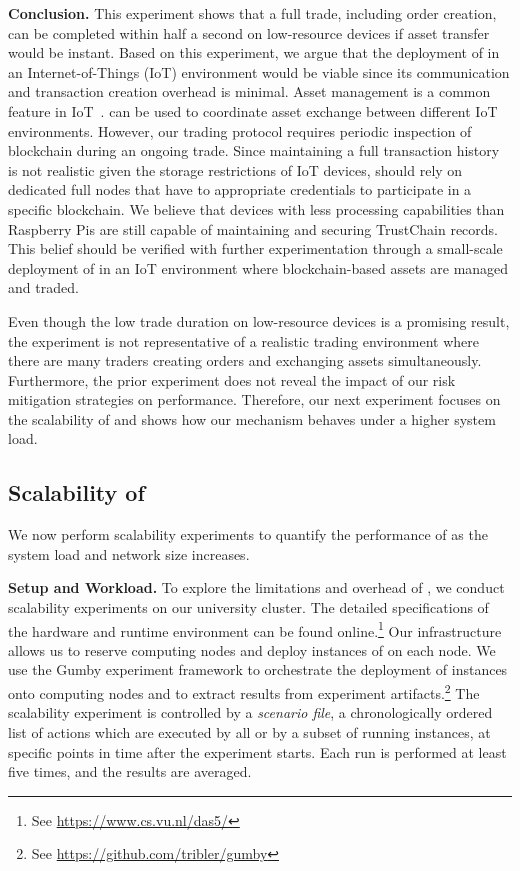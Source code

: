\textbf{Conclusion.}
This experiment shows that a full trade, including order creation, can be completed within half a second on low-resource devices if asset transfer would be instant.
Based on this experiment, we argue that the deployment of \ModelName{} in an Internet-of-Things (IoT) environment would be viable since its communication and transaction creation overhead is minimal.
Asset management is a common feature in IoT~\cite{gilchrist2016industry}.
\ModelName{} can be used to coordinate asset exchange between different IoT environments.
However, our trading protocol requires periodic inspection of blockchain during an ongoing trade.
Since maintaining a full transaction history is not realistic given the storage restrictions of IoT devices, \ModelName{} should rely on dedicated full nodes that have to appropriate credentials to participate in a specific blockchain.
We believe that devices with less processing capabilities than Raspberry Pis are still capable of maintaining and securing TrustChain records.
This belief should be verified with further experimentation through a small-scale deployment of \ModelName{} in an IoT environment where blockchain-based assets are managed and traded.

Even though the low trade duration on low-resource devices is a promising result, the experiment is not representative of a realistic trading environment where there are many traders creating orders and exchanging assets simultaneously.
Furthermore, the prior experiment does not reveal the impact of our risk mitigation strategies on performance.
Therefore, our next experiment focuses on the scalability of \ModelName{} and shows how our mechanism behaves under a higher system load.

\subsection{Scalability of \ModelName{}}
\label{subsec:scalability_experiment}
We now perform scalability experiments to quantify the performance of \ModelName{} as the system load and network size increases.

\textbf{Setup and Workload.}
To explore the limitations and overhead of \ModelName{}, we conduct scalability experiments on our university cluster.
The detailed specifications of the hardware and runtime environment can be found online.\footnote{See \url{https://www.cs.vu.nl/das5/}}
Our infrastructure allows us to reserve computing nodes and deploy instances of \ModelName{} on each node.
We use the Gumby experiment framework to orchestrate the deployment of \ModelName{} instances onto computing nodes and to extract results from experiment artifacts.\footnote{See \url{https://github.com/tribler/gumby}}
The scalability experiment is controlled by a \emph{scenario file}, a chronologically ordered list of actions which are executed by all or by a subset of running instances, at specific points in time after the experiment starts.
Each run is performed at least five times, and the results are averaged.


